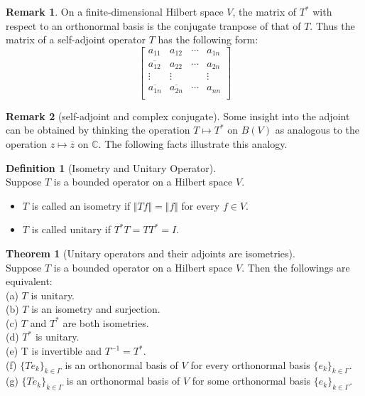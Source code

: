 \documentclass[12pt]{book}
\theoremstyle{definition}
\newtheorem{definition}{Definition}[chapter]
\newtheorem{theorem}{Theorem}[chapter]
\newtheorem{remark}{Remark}
\begin{document}
\begin{remark}
On a finite-dimensional Hilbert space $V$, the matrix of $T^*$ with respect to an orthonormal basis is the conjugate tranpose of that of $T$. Thus the matrix of a self-adjoint operator $T$ has the following form:
$$
\begin{bmatrix}
	a_{11} & a_{12} & \cdots & a_{1n} \\
	\overline{a_{12}} & a_{22} & \cdots & a_{2n} \\
	\vdots & \vdots &     &     \vdots \\
	\overline{a_{1n}} & \overline{a_{2n}} & \cdots & a_{nn} \\
\end{bmatrix}
$$  
\end{remark}

\begin{remark}[self-adjoint and complex conjugate]
Some insight into the adjoint can be obtained by thinking the operation $T \mapsto T^*$ on $B(V)$ as analogous to the operation $ z \mapsto \overline z$ on $\mathbb C$. The following facts illustrate this analogy.  
\end{remark}





















\newpage
\begin{definition}[Isometry and Unitary Operator] \ \\
Suppose $T$ is a bounded operator on a Hilbert space $V$.
\begin{itemize}
	\item $T$ is called an isometry if $\Vert Tf \Vert = \Vert f \Vert$ for every $f\in V$.
	\item $T$ is called unitary if $T^*T=TT^*=I$.
\end{itemize}	
\end{definition}

\begin{theorem}[Unitary operators and their adjoints are isometries] \ \\ 
Suppose $T$ is a bounded operator on a Hilbert space $V$. Then the followings are equivalent: \\
(a) $T$ is unitary. \\
(b) $T$ is an isometry and surjection. \\
(c) $T$ and $T^*$ are both isometries. \\
(d) $T^*$ is unitary. \\
(e) T is invertible and $T^{-1}=T^*$. \\
(f) $\{Te_k\}_{k \in \Gamma}$ is an orthonormal basis of $V$ for every orthonormal basis $\{e_k\}_{k\in\Gamma}$. \\
(g) $\{Te_k\}_{k \in \Gamma}$ is an orthonormal basis of $V$ for some orthonormal basis $\{e_k\}_{k\in\Gamma}$. \\
\end{theorem}
\end{document}
